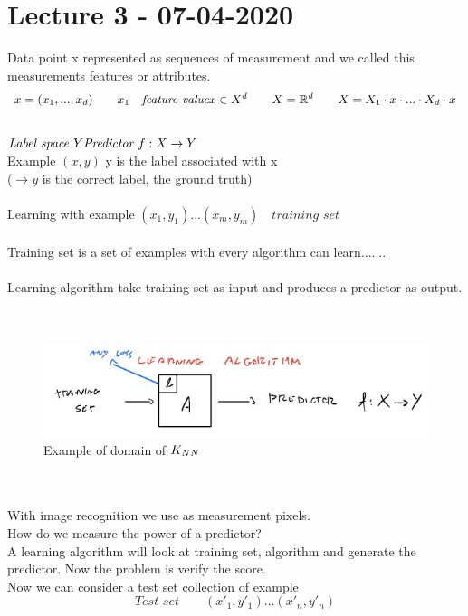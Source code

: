 \documentclass[../main.tex]{subfiles}
\begin{document}
\chapter{Lecture 3 - 07-04-2020}
Data point x represented as sequences of measurement and we called this
measurements features or attributes.\\
$$ x = (x_1,..., x_d)  \qquad x_1 \quad \textit{feature value}
x \in X^d \qquad X = \mathbb{R}^d \qquad X = X_1 \cdot x \cdot ... \cdot X_d \cdot x
$$
\\
$
\textit{Label space } Y\\
\textit{Predictor } f : X \rightarrow Y \\
$
\\
Example $(x,y)$ \qquad y is the label associated with x\\
($ \rightarrow y$ is the correct label, the ground truth)\\
\\
Learning with example $(x_1,y_1)...(x_m,y_m)  \quad \textit{training set} $\\\\
Training set is a set of examples with every algorithm can learn.......\\\\
Learning algorithm take training set as input and produces a predictor as output.\\\\
\\
\begin{figure}[h]
    \centering
    \includegraphics[width=0.8\linewidth]{../img/lez3-img1.JPG}
    \caption{Example of domain of $K_{NN}$}
\end{figure}\\
\\With image recognition we use as measurement pixels.\\
How do we measure the power of a predictor?\\
A learning algorithm will look at training set, algorithm and generate the predictor. Now the problem is verify the score. \\
Now we can consider a test set collection of example
\\
$$ \textit{Test set} \qquad(x'_1, y'_1)...(x'_n,y'_n) $$
\end{document}

